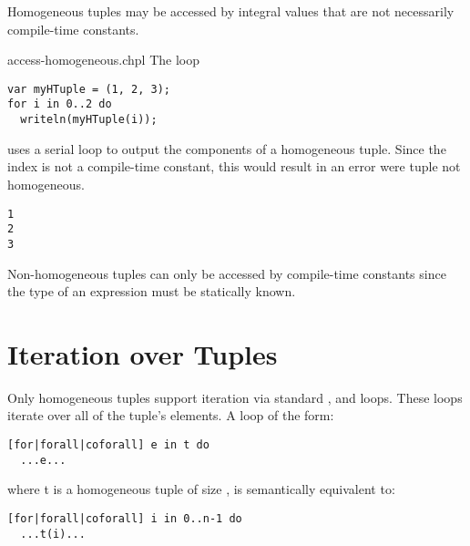 Homogeneous tuples may be accessed by integral values that are not
necessarily compile-time constants.

\begin{chapelexample}{access-homogeneous.chpl}
The loop
\begin{chapel}
\begin{verbatim}
var myHTuple = (1, 2, 3);
for i in 0..2 do
  writeln(myHTuple(i));
\end{verbatim}
\end{chapel}
uses a serial loop to output the components of a homogeneous tuple.
Since the index is not a compile-time constant, this would result in
an error were tuple not homogeneous.
\begin{chapeloutput}
\begin{verbatim}
1
2
3
\end{verbatim}
\end{chapeloutput}
\end{chapelexample}

\begin{rationale}
Non-homogeneous tuples can only be accessed by compile-time constants
since the type of an expression must be statically known.
\end{rationale}

\section{Iteration over Tuples}
\label{Iteration_over_Tuples}

Only homogeneous tuples support iteration via
standard ,  and  loops.  These loops
iterate over all of the tuple's elements.  A loop of the form:

\begin{chapel}
\begin{verbatim}
[for|forall|coforall] e in t do
  ...e...
\end{verbatim}
\end{chapel}

where t is a homogeneous tuple of size , is semantically
equivalent to:

\begin{chapel}
\begin{verbatim}
[for|forall|coforall] i in 0..n-1 do
  ...t(i)...
\end{verbatim}
\end{chapel}

